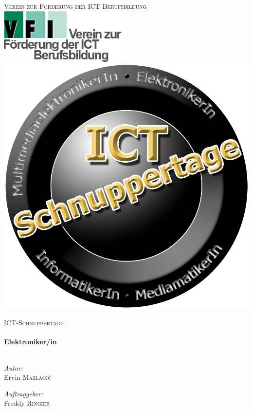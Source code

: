 
\begin{titlepage}

\begin{center}



\textsc{\LARGE Verein zur Förderung der ICT-Berufsbildung}\\[2cm]

\includegraphics[scale=0.5]{../pictures/vfi-logo.png}
\vfill
\includegraphics[scale=0.4]{../pictures/ict-logo.png}
\vfill

\textsc{\Large ICT-Schnuppertage}\\[0.5cm]

\HRule \\[0.4cm]
{ \huge \bfseries Elektroniker/in}\\[0.4cm]

\HRule \\[1.5cm]

\begin{minipage}{0.4\textwidth}
\begin{flushleft} \large
\emph{Autor:}\\
Ervin \textsc{Mazlagi\'c}
\end{flushleft}
\end{minipage}
\hfill
\begin{minipage}{0.4\textwidth}
\begin{flushright} \large
\emph{Auftraggeber:} \\
Freddy \textsc{Ringier}
\end{flushright}
\end{minipage}


\end{center}
\end{titlepage}
